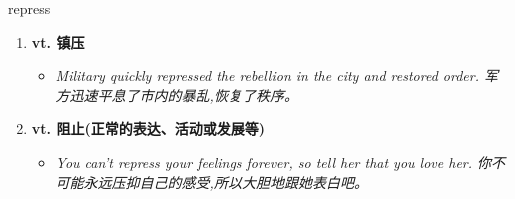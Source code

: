 
\begin{frame}
{\huge repress}
\begin{center}
\begin{enumerate}\Large
  \item \textbf{vt. 镇压}
  \begin{itemize}
    \item \em{\Large{Military quickly repressed the rebellion in the city and restored order. 军方迅速平息了市内的暴乱,恢复了秩序。}}
  \end{itemize}
  \item \textbf{vt. 阻止(正常的表达、活动或发展等)}
  \begin{itemize}
    \item \em{\Large{You can't repress your feelings forever, so tell her that you love her. 你不可能永远压抑自己的感受,所以大胆地跟她表白吧。}}
  \end{itemize}
\end{enumerate}
\end{center}
\end{frame}
